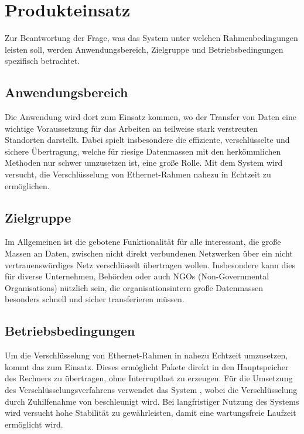 \section{Produkteinsatz}
Zur Beantwortung der Frage, was das System unter welchen Rahmenbedingungen leisten soll, werden Anwendungsbereich, Zielgruppe und Betriebsbedingungen spezifisch betrachtet.
\subsection{Anwendungsbereich}
Die Anwendung wird dort zum Einsatz kommen, wo der Transfer von Daten eine wichtige Voraussetzung für das Arbeiten an teilweise stark verstreuten Standorten darstellt.
Dabei spielt insbesondere die effiziente, verschlüsselte und sichere Übertragung, welche für riesige Datenmassen mit den herkömmlichen Methoden nur schwer umzusetzen ist, eine große Rolle.
Mit dem System wird versucht, die Verschlüsselung von Ethernet-Rahmen nahezu in Echtzeit zu ermöglichen.

\subsection{Zielgruppe}
Im Allgemeinen ist die gebotene Funktionalität für alle interessant, die große Massen an Daten, zwischen nicht direkt verbundenen Netzwerken über ein nicht vertrauenswürdiges Netz verschlüsselt übertragen wollen. 
Insbesondere kann dies für diverse Unternehmen, Behörden oder auch NGOs (Non-Governmental Organisations) nützlich sein, die organisationsintern große Datenmassen besonders schnell und sicher transferieren müssen.


\subsection{Betriebsbedingungen}
Um die Verschlüsselung von Ethernet-Rahmen in nahezu Echtzeit umzusetzen, kommt das  zum Einsatz. 
Dieses ermöglicht Pakete direkt in den Hauptspeicher des Rechners zu übertragen, ohne Interruptlast zu erzeugen.
Für die Umsetzung des Verschlüsselungsverfahrens verwendet das System , wobei die Verschlüsselung durch Zuhilfenahme von  beschleunigt wird.
Bei langfristiger Nutzung des Systems wird versucht hohe Stabilität zu gewährleisten, damit eine wartungsfreie Laufzeit ermöglicht wird.
